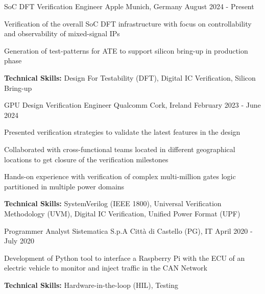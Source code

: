 

\begin{cventries}

  \cventry
    {SoC DFT Verification Engineer} %
    {Apple} %
    {Munich, Germany} %
    {August 2024 - Present} %
    {
      \begin{cvitems} %
        \item {Verification of the overall SoC DFT infrastructure with focus on controllability and observability of mixed-signal IPs}
        \item {Generation of test-patterns for ATE to support silicon bring-up in production phase}
        \item {\textbf{Technical Skills:} Design For Testability (DFT), Digital IC Verification, Silicon Bring-up}
      \end{cvitems}
    }

  \cventry
    {GPU Design Verification Engineer} %
    {Qualcomm} %
    {Cork, Ireland} %
    {February 2023 - June 2024} %
    {
      \begin{cvitems} %
        \item {Presented verification strategies to validate the latest features in the design}
        \item {Collaborated with cross-functional teams located in different geographical locations to get closure of the verification milestones}
        \item {Hands-on experience with verification of complex multi-million gates logic partitioned in multiple power domains}
        \item {\textbf{Technical Skills:} SystemVerilog (IEEE 1800), Universal Verification Methodology (UVM), Digital IC Verification, Unified Power Format (UPF)}
      \end{cvitems}
    }

  \cventry
    {Programmer Analyst} %
    {Sistematica S.p.A} %
    {Città di Castello (PG), IT} %
    {April 2020 - July 2020} %
    {
      \begin{cvitems} %
        \item {Development of Python tool to interface a Raspberry Pi with the ECU of an electric vehicle to monitor and inject traffic in the CAN Network}
        \item {\textbf{Technical Skills:} Hardware-in-the-loop (HIL), Testing}
      \end{cvitems}
    }


\end{cventries}
